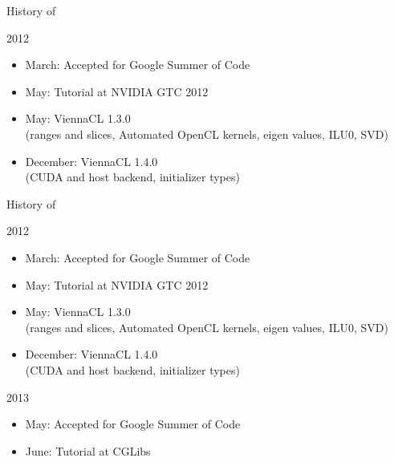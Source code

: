 \begin{frame}{History of \ViennaCL}

\begin{block}{2012}
  \begin{itemize}
   \item March: Accepted for Google Summer of Code
   \item May: Tutorial at NVIDIA GTC 2012
   \item May: ViennaCL 1.3.0 \\ (ranges and slices, Automated OpenCL kernels, eigen values, ILU0, SVD)
   \item December: ViennaCL 1.4.0 \\ (CUDA and host backend, initializer types)
  \end{itemize}
\end{block}

\vspace{2.07cm}

\end{frame}


\begin{frame}{History of \ViennaCL}

\begin{block}{2012}
  \begin{itemize}
   \item March: Accepted for Google Summer of Code
   \item May: Tutorial at NVIDIA GTC 2012
   \item May: ViennaCL 1.3.0 \\ (ranges and slices, Automated OpenCL kernels, eigen values, ILU0, SVD)
   \item December: ViennaCL 1.4.0 \\ (CUDA and host backend, initializer types)
  \end{itemize}
\end{block}

\begin{block}{2013}
  \begin{itemize}
   \item May: Accepted for Google Summer of Code
   \item June: Tutorial at CGLibs
  \end{itemize}
\end{block}

\end{frame}


% 
% 



